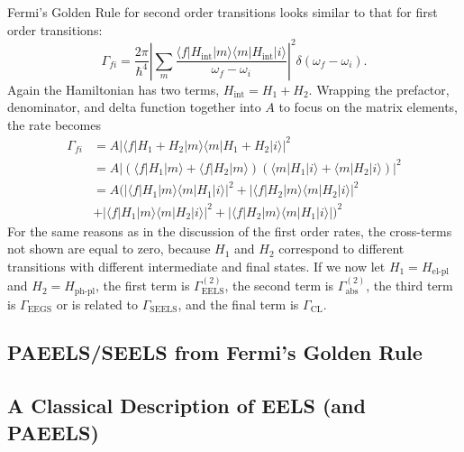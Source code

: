 \documentclass [11pt, proquest] {uwthesis}[2016/11/22]
\begin{document}
Fermi's Golden Rule for second order transitions looks similar to that for first order transitions:
\begin{equation}
\Gamma_{fi} = \frac{2\pi}{\hbar^4}\left|\sum_{m}\frac{\langle f |H_{\textrm{int}}| m \rangle \langle m |H_{\textrm{int}}| i \rangle }{\omega_f-\omega_i}\right|^2 \delta(\omega_f - \omega_i).
\label{FGR_2}
\end{equation}
Again the Hamiltonian has two terms, $H_{\textrm{int}} = H_1 + H_2$. Wrapping the prefactor, denominator, and delta function together into $A$ to focus on the matrix elements, the rate becomes
\begin{equation}
\begin{aligned}
\Gamma_{fi} &= A|\langle f |H_1 + H_2| m \rangle \langle m |H_1 + H_2| i \rangle|^2\\
&= A|(\langle f |H_1| m \rangle + \langle f |H_2| m \rangle) (\langle m |H_1| i \rangle + \langle m |H_2| i \rangle)|^2\\
&= A(|\langle f |H_1| m \rangle \langle m |H_1| i \rangle|^2 + |\langle f |H_2| m \rangle \langle m |H_2| i \rangle|^2\\
&+ |\langle f |H_1| m \rangle \langle m |H_2| i \rangle|^2 + |\langle f |H_2| m \rangle \langle m |H_1| i \rangle|)^2
\label{FGR_2_2}
\end{aligned}
\end{equation}
For the same reasons as in the discussion of the first order rates, the cross-terms not shown are equal to zero, because $H_1$ and $H_2$ correspond to different transitions with different intermediate and final states. If we now let $H_1 = H_\textrm{el-pl}$ and $H_2 = H_{\textrm{ph-pl}}$, the first term is $\Gamma_{\textrm{EELS}}^{(2)}$, the second term is $\Gamma_{\textrm{abs}}^{(2)}$, the third term is $\Gamma_{\textrm{EEGS}}$ or is related to $\Gamma_{\textrm{SEELS}}$, and the final term is $\Gamma_{\textrm{CL}}$.

\subsection{PAEELS/SEELS from Fermi's Golden Rule}



\subsection{A Classical Description of EELS (and PAEELS)}
\end{document}

